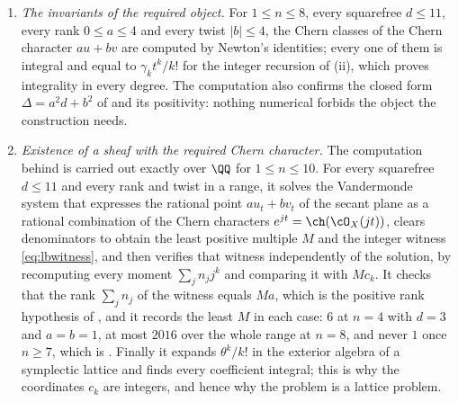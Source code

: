 \begin{enumerate}[label=\textup{(\Roman*)},leftmargin=*]
\item \emph{The invariants of the required object.} For $1\le n\le8$, every
  squarefree $d\le11$, every rank $0\le a\le4$ and every twist $|b|\le4$, the
  Chern classes of the Chern character $au+bv$ are computed by Newton's
  identities; every one of them is integral and equal to
  $\gamma_{k}t^{k}/k!$ for the integer recursion of
  (ii), which proves integrality in every degree. The
  computation also confirms the closed form $\Delta=a^{2}d+b^{2}$ of
   and its positivity: nothing numerical forbids
  the object the construction needs.

\item \emph{Existence of a sheaf with the required Chern character.} The
  computation behind  is carried out exactly over
  $\QQ$ for $1\le n\le10$. For every squarefree $d\le11$ and every rank and
  twist in a range, it solves the Vandermonde system that expresses the
  rational point $au_{t}+bv_{t}$ of the secant plane as a rational
  combination of the Chern characters $e^{jt}=\ch(\cO_{X}(jt))$, clears
  denominators to obtain the least positive multiple $M$ and the integer
  witness \eqref{eq:lbwitness}, and then verifies that witness independently
  of the solution, by recomputing every moment $\sum_{j}n_{j}j^{k}$ and
  comparing it with $Mc_{k}$. It checks that the rank $\sum_{j}n_{j}$ of the
  witness equals $Ma$, which is the positive rank hypothesis of
  , and it records the least $M$ in each case: $6$ at $n=4$
  with $d=3$ and $a=b=1$, at most $2016$ over the whole range at $n=8$, and
  never $1$ once $n\ge7$, which is . Finally it expands
  $\theta^{k}/k!$ in the exterior algebra of a symplectic lattice and finds
  every coefficient integral; this is why the coordinates $c_{k}$ are
  integers, and hence why the problem is a lattice problem.


\end{enumerate}
